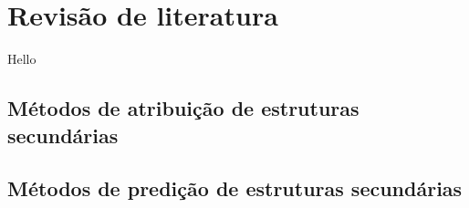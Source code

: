 
\chapter{Revisão de literatura}\label{ch:rev_literatura}


Hello \citep{kendrew1958three}

\section{Métodos de atribuição de estruturas secundárias}\label{section:metodos_atribuicao}





\section{Métodos de predição de estruturas secundárias}



